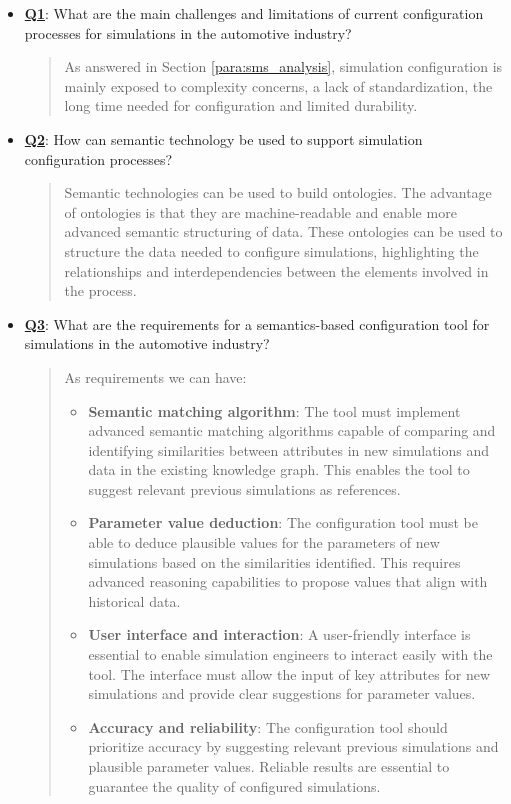 \begin{itemize}
    \item \hyperref[Q1]{\textbf{Q1}}: What are the main challenges and limitations of current configuration processes for simulations in the automotive industry?
    \begin{quote}
        As answered in Section \ref{para:sms_analysis}, simulation configuration is mainly exposed to complexity concerns, a lack of standardization, the long time needed for configuration and limited durability.\\
    \end{quote}

    \item \hyperref[Q2]{\textbf{Q2}}: How can semantic technology be used to support simulation configuration processes?
    \begin{quote}
        Semantic technologies can be used to build ontologies. The advantage of ontologies is that they are machine-readable and enable more advanced semantic structuring of data. These ontologies can be used to structure the data needed to configure simulations, highlighting the relationships and interdependencies between the elements involved in the process.\\
    \end{quote}
    
    \item \hyperref[Q3]{\textbf{Q3}}: What are the requirements for a semantics-based configuration tool for simulations in the automotive industry?
    \begin{quote}
        As requirements we can have:
        \begin{itemize}
            \item \textbf{Semantic matching algorithm}: The tool must implement advanced semantic matching algorithms capable of comparing and identifying similarities between attributes in new simulations and data in the existing knowledge graph. This enables the tool to suggest relevant previous simulations as references.
            \item \textbf{Parameter value deduction}: The configuration tool must be able to deduce plausible values for the parameters of new simulations based on the similarities identified. This requires advanced reasoning capabilities to propose values that align with historical data.
            \item \textbf{User interface and interaction}: A user-friendly interface is essential to enable simulation engineers to interact easily with the tool. The interface must allow the input of key attributes for new simulations and provide clear suggestions for parameter values.
            \item \textbf{Accuracy and reliability}: The configuration tool should prioritize accuracy by suggesting relevant previous simulations and plausible parameter values. Reliable results are essential to guarantee the quality of configured simulations.\\
        \end{itemize}
    \end{quote}
    

\end{itemize}
